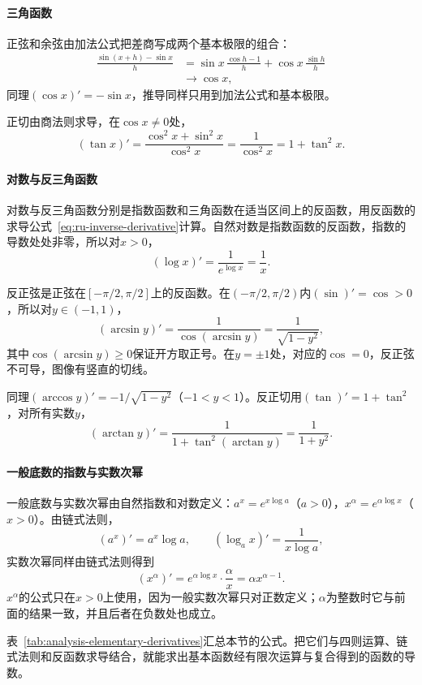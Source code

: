 \paragraph{三角函数}
正弦和余弦由加法公式把差商写成两个基本极限的组合：
\[
 \begin{aligned}
 \frac{\sin(x+h)-\sin x}h
 &=\sin x\,\frac{\cos h-1}h+\cos x\,\frac{\sin h}h\\
 &\to\cos x,
 \end{aligned}
\]
同理$(\cos x)'=-\sin x$，推导同样只用到加法公式和基本极限。

正切由商法则求导，在$\cos x\neq0$处，
\[
 (\tan x)'=\frac{\cos^2x+\sin^2x}{\cos^2x}=\frac1{\cos^2x}=1+\tan^2x.
\]

\paragraph{对数与反三角函数}
对数与反三角函数分别是指数函数和三角函数在适当区间上的反函数，用反函数的求导公式~\eqref{eq:ru-inverse-derivative}计算。自然对数是指数函数的反函数，指数的导数处处非零，所以对$x>0$，
\[
 (\log x)'=\frac1{e^{\log x}}=\frac1x.
\]

反正弦是正弦在$[-\pi/2,\pi/2]$上的反函数。在$(-\pi/2,\pi/2)$内$(\sin)'=\cos>0$，所以对$y\in(-1,1)$，
\[
 (\arcsin y)'=\frac1{\cos(\arcsin y)}=\frac1{\sqrt{1-y^2}},
\]
其中$\cos(\arcsin y)\geq0$保证开方取正号。在$y=\pm1$处，对应的$\cos=0$，反正弦不可导，图像有竖直的切线。

同理$(\arccos y)'=-1/\sqrt{1-y^2}$（$-1<y<1$）。反正切用$(\tan)'=1+\tan^2$，对所有实数$y$，
\[
 (\arctan y)'=\frac1{1+\tan^2(\arctan y)}=\frac1{1+y^2}.
\]

\paragraph{一般底数的指数与实数次幂}
一般底数与实数次幂由自然指数和对数定义：$a^x=e^{x\log a}$（$a>0$），$x^\alpha=e^{\alpha\log x}$（$x>0$）。由链式法则，
\[
 (a^x)'=a^x\log a,\qquad (\log_ax)'=\frac1{x\log a},
\]
实数次幂同样由链式法则得到
\[
 (x^\alpha)'=e^{\alpha\log x}\cdot\frac\alpha x=\alpha x^{\alpha-1}.
\]
$x^\alpha$的公式只在$x>0$上使用，因为一般实数次幂只对正数定义；$\alpha$为整数时它与前面的结果一致，并且后者在负数处也成立。

表~\ref{tab:analysis-elementary-derivatives}汇总本节的公式。把它们与四则运算、链式法则和反函数求导结合，就能求出基本函数经有限次运算与复合得到的函数的导数。

